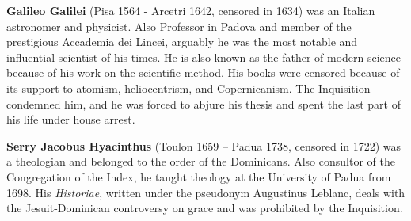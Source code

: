 
\textbf{Galileo Galilei} (Pisa 1564 - Arcetri 1642, censored in 1634) was an Italian astronomer and physicist. Also Professor in Padova and member of the prestigious Accademia dei Lincei, arguably he was the most notable and influential scientist of his times. He is also known as the father of modern science because of his work on the scientific method. His books were censored because of its support to atomism, heliocentrism, and Copernicanism. The Inquisition condemned him, and he was forced to abjure his thesis and spent the last part of his life under house arrest.

\textbf{Serry Jacobus Hyacinthus} (Toulon 1659 – Padua 1738, censored in 1722) was a theologian and belonged to the order of the Dominicans. Also consultor of the Congregation of the Index, he taught theology at the University of Padua from 1698. His \textit{Historiae}, written under the pseudonym Augustinus Leblanc, deals with the Jesuit-Dominican controversy on grace and was prohibited by the Inquisition.
